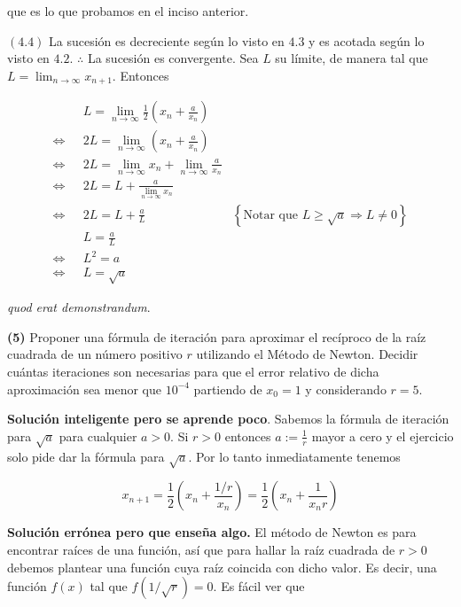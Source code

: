 \documentclass[12pt]{article}
\begin{document}
que es lo que probamos en el inciso anterior.

$(4.4)$ La sucesión es decreciente según lo visto en $4.3$ y es acotada según lo
visto en $4.2$. $\therefore $ La sucesión es convergente. Sea $L$ su límite,
de manera tal que $L = \lim_{n \to \infty} x_{n+1}$. Entonces

\begin{align*}
    &L = \lim_{n \to \infty} \frac{1}{2}\left( x_n  + \frac{a}{x_n}\right)  \\ 
    \iff ~ ~ ~ 
    &2L = \lim_{n \to \infty} \left( x_n + \frac{a}{x_n} \right)  \\ 
    \iff ~ ~ ~ 
    &2L = \lim_{n \to \infty} x_n + \lim_{n \to \infty} \frac{a}{x_n} \\ 
    \iff ~ ~ ~ 
    &2L = L +  \frac{a}{\lim_{n\to \infty} x_n} \\
    \iff ~ ~ ~ 
    &2L = L + \frac{a}{L}
    &\left\{ \text{Notar que }
    L \geq \sqrt{a} \Rightarrow L \neq 0 \right\} \\ 
    &L = \frac{a}{L} \\ 
    \iff ~ ~ ~ 
    &L^2 = a \\ 
    \iff ~ ~ ~ 
    &L = \sqrt{a} 
\end{align*}

\textit{quod erat demonstrandum}.

\pagebreak 

\begin{myframe}
    \textbf{(5)} Proponer una fórmula de iteración para aproximar el recíproco de la raíz
    cuadrada de un número positivo $r$ utilizando el Método de Newton. Decidir
    cuántas iteraciones son necesarias para que el error relativo de dicha
    aproximación sea menor que $10^{-4}$ partiendo de $x_0 = 1$ y considerando
    $r = 5$.
\end{myframe}

\textbf{Solución inteligente pero se aprende poco}. Sabemos la fórmula de
iteración para $\sqrt{a} $ para cualquier $a > 0$. Si $r > 0$ entonces $a :=
\frac{1}{r}$ mayor a cero y el ejercicio solo pide dar la fórmula para $\sqrt{a}
$. Por lo tanto inmediatamente tenemos 

\begin{equation*}
    x_{n+1} = \frac{1}{2}\left( x_n + \frac{1/r}{x_n} \right) = \frac{1}{2}\left(
    x_n + \frac{1}{x_n r} \right)
\end{equation*}

\textbf{Solución errónea pero que enseña algo.} El método de Newton es para encontrar raíces de una función, así que para
hallar la raíz cuadrada de $r > 0$ debemos plantear una función cuya raíz
coincida con dicho valor. Es decir, una función $f(x)$ tal que $f(1 / \sqrt{r} ) =
0$. Es fácil ver que
\end{document}
